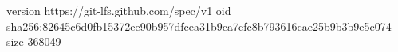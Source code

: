 version https://git-lfs.github.com/spec/v1
oid sha256:82645c6d0fb15372ee90b957dfcea31b9ca7efc8b793616cae25b9b3b9e5c074
size 368049
